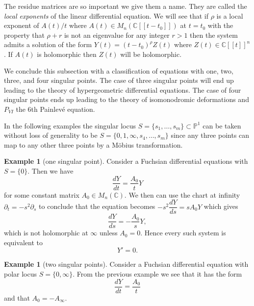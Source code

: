 \documentclass[12pt]{book}
\numberwithin{equation}{section}
\theoremstyle{definition}
\newtheorem{example}[theorem]{Example}
\theoremstyle{remark}
\newcommand{\CC}{\mathbb{C}}
\newcommand{\PP}{\mathbb{P}}
\begin{document}
The residue matrices are so important we give them a name.
They are called the \emph{local exponents} of the linear differential equation. 
We will see that if $\rho$ is a local exponent of $A(t)/t$ where  $A(t)\in M_n(\CC[[t-t_0]])$ at $t=t_0$ with the property that $\rho+r$ is not an eigenvalue for any integer $r>1$ then the system admits a solution of the form $Y(t) = (t-t_0)^{\rho}Z(t)$ where $Z(t) \in \CC[[t]]^n$. 
If $A(t)$ is holomorphic then $Z(t)$ will be holomorphic.

We conclude this subsection with a classification of equations with one, two, three, and four singular points. 
The case of three singular points will end up leading to the theory of hypergeometric differential equations. 
The case of four singular points ends up leading to the theory of isomonodromic deformations and $P_{VI}$ the 6th Painlev\'{e} equation.

In the following examples the singular locus $S = \lbrace s_1,\ldots,s_m \rbrace \subset \PP^1$ can be taken without loss of generality to be $S=\lbrace 0,1,\infty,s_4,\ldots,s_m\rbrace$ since any three points can map to any other three points by a M\"obius transformation. 
\begin{example}[one singular point]
	Consider a Fuchsian differential equations with $S = \lbrace 0 \rbrace$. 
	Then we have 
	 $$ \dfrac{dY}{dt}= \frac{A_0}{t} Y $$
	for some constant matrix $A_0 \in M_n(\CC)$. 
	We then can use the chart at infinity $\partial_t = -s^2 \partial_s$ to conclude that the equation becomes $-s^2 \dfrac{dY}{ds} = s A_0 Y$ which gives 
	 $$ \dfrac{dY}{ds} = -\frac{A_0}{s}Y,$$
	which is not holomorphic at $\infty$ unless $A_0 = 0$. 
	Hence every such system is equivalent to 
	$$Y'=0.$$
\end{example}

\begin{example}[two singular points]
	Consider a Fuchsian differential equation with polar locus $S = \lbrace 0, \infty \rbrace$. 
	From the previous example we see that it has the form 
	 $$ \frac{dY}{dt} = \frac{A_0}{t} $$
	and that $A_0 = -A_{\infty}$.
\end{example}
\end{document}
